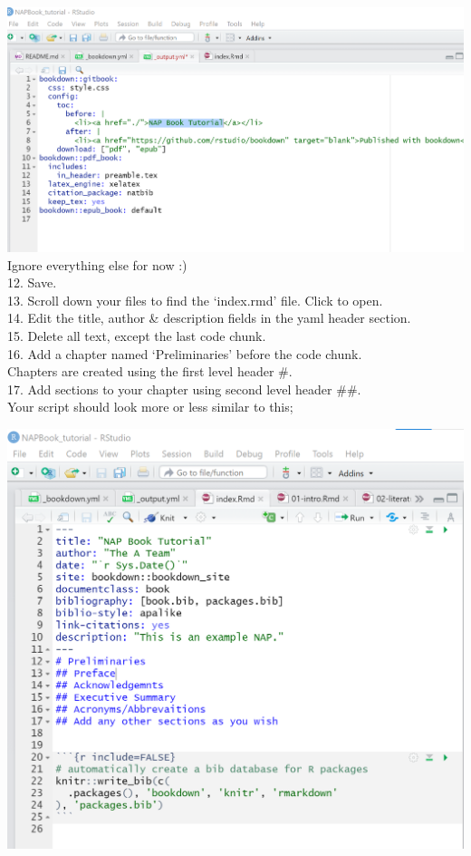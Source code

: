 \documentclass[
]{book}
\let\origfigure\figure
\let\endorigfigure\endfigure
\renewenvironment{figure}[1][2] {
    \expandafter\origfigure\expandafter[H]
} {
    \endorigfigure
}
\begin{document}
\includegraphics{tutorial_screenshots/edit_title_output_yaml.png}\\
Ignore everything else for now :)\\
12. Save.\\
13. Scroll down your files to find the `index.rmd' file. Click to open.\\
14. Edit the title, author \& description fields in the yaml header section.\\
15. Delete all text, except the last code chunk.\\
16. Add a chapter named `Preliminaries' before the code chunk.\\
Chapters are created using the first level header \#.\\
17. Add sections to your chapter using second level header \#\#.\\
Your script should look more or less similar to this;

\begin{figure}
\centering
\includegraphics{tutorial_screenshots/edit_index.png}
\caption{edit book title and author}
\end{figure}
\end{document}
